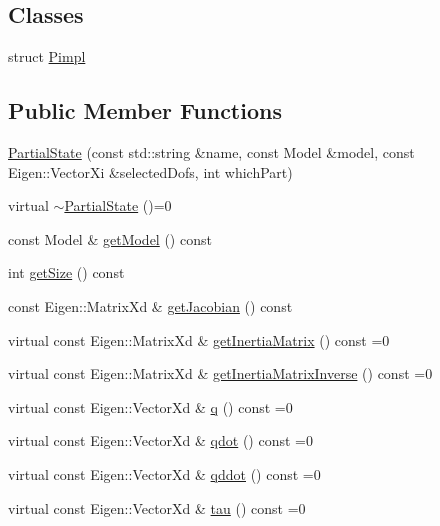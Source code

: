 \subsection*{Classes}
\begin{DoxyCompactItemize}
\item 
struct \hyperlink{structocra_1_1PartialState_1_1Pimpl}{Pimpl}
\end{DoxyCompactItemize}
\subsection*{Public Member Functions}
\begin{DoxyCompactItemize}
\item 
\hyperlink{classocra_1_1PartialState_ab6f225c821033965da2ccd5924c23915}{Partial\+State} (const std\+::string \&name, const Model \&model, const Eigen\+::\+Vector\+Xi \&selected\+Dofs, int which\+Part)
\item 
virtual \hyperlink{classocra_1_1PartialState_a6426dc8cd115e310f16f0d244802618f}{$\sim$\+Partial\+State} ()=0
\item 
const Model \& \hyperlink{classocra_1_1PartialState_a2de65bbf0d2bb85a98d444c3f3bf0b06}{get\+Model} () const
\item 
int \hyperlink{classocra_1_1PartialState_a220a155999e190427083af329d1f52b0}{get\+Size} () const
\item 
const Eigen\+::\+Matrix\+Xd \& \hyperlink{classocra_1_1PartialState_a563b7fb82df68c847120211884019e17}{get\+Jacobian} () const
\item 
virtual const Eigen\+::\+Matrix\+Xd \& \hyperlink{classocra_1_1PartialState_ad811a25932f0fad439242ebd48841162}{get\+Inertia\+Matrix} () const =0
\item 
virtual const Eigen\+::\+Matrix\+Xd \& \hyperlink{classocra_1_1PartialState_a83979e39dd3631861c724514e49cb8b4}{get\+Inertia\+Matrix\+Inverse} () const =0
\item 
virtual const Eigen\+::\+Vector\+Xd \& \hyperlink{classocra_1_1PartialState_a28f537d2c569eddb7f7d6dbbea073226}{q} () const =0
\item 
virtual const Eigen\+::\+Vector\+Xd \& \hyperlink{classocra_1_1PartialState_a5af623db2ae7e68cb4658f226e8ae006}{qdot} () const =0
\item 
virtual const Eigen\+::\+Vector\+Xd \& \hyperlink{classocra_1_1PartialState_ad12359c11926c2151dc1459e88b9fedc}{qddot} () const =0
\item 
virtual const Eigen\+::\+Vector\+Xd \& \hyperlink{classocra_1_1PartialState_a875575d215c7fe9278d47ff6f392bb84}{tau} () const =0
\end{DoxyCompactItemize}
